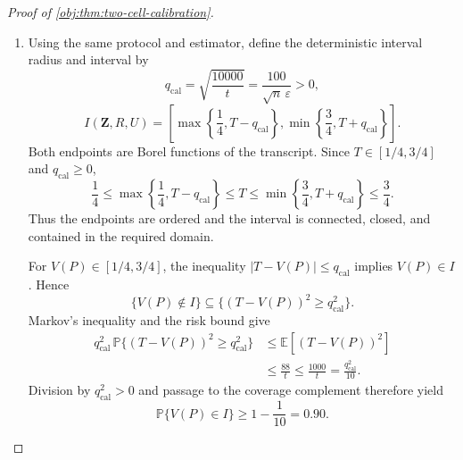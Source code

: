 \begin{proof}[Proof of \cref{obj:thm:two-cell-calibration}]
\begin{enumerate}
Projection toward this interval reduces squared error:
\[
(T-V(P))^2
\le(\widetilde V_{\mathrm{cal}}-V(P))^2.
\]
Indeed, if \(\widetilde V_{\mathrm{cal}}\le1/4\), then
\(T=1/4\le V(P)\); if \(\widetilde V_{\mathrm{cal}}\ge3/4\), then
\(V(P)\le T=3/4\); and inside the interval \(T=\widetilde V_{\mathrm{cal}}\).

The reverse triangle inequality gives
\[
\bigl(|\widehat\tau_j|-|\tau_j(P)|\bigr)^2
\le(\widehat\tau_j-\tau_j(P))^2
\qquad(j\in[2]).
\]
Applying the squared-sum inequality first to the baseline and contrast contributions and then to the two contrast contributions proves the pointwise bound
\[
(T-V(P))^2
\le
2(\widehat B_{\mathrm{cal}}-B(P))^2
+\frac{
(\widehat\tau_1-\tau_1(P))^2+
(\widehat\tau_2-\tau_2(P))^2
}{4}.
\]
Integrating and substituting the component bounds gives
\[
\mathbb E[(T-V(P))^2]
\le
\frac1{2m_{\mathrm{bin}}\delta^2}
+\frac2{m_{\mathrm{vec}}\delta^2}.
\]

The half split satisfies
\[
m_{\mathrm{bin}}\ge\frac n3,
\qquad
m_{\mathrm{vec}}\ge\frac n2.
\]
For the first inequality, even \(n\) gives \(m_{\mathrm{bin}}=n/2\); odd \(n\ge3\) gives
\(m_{\mathrm{bin}}=(n-1)/2\ge n/3\).
The second follows from \(m_{\mathrm{bin}}\le n/2\).
Together with \(\delta\ge\varepsilon/4\), these bounds yield the numerical calibration
\[
\begin{aligned}
\mathbb E[(T-V(P))^2]
&\le
\frac1{2(n/3)\delta^2}
+\frac2{(n/2)\delta^2}\\
&=\frac{88}{n(4\delta)^2}
\le\frac{88}{n\varepsilon^2}
=\frac{88}{t}
\le\frac{1000}{t}.
\end{aligned}
\]

\item
Using the same protocol and estimator, define the deterministic interval radius and interval by
\[
q_{\mathrm{cal}}
=\sqrt{\frac{10000}{t}}
=\frac{100}{\sqrt n\,\varepsilon}>0,
\]
\[
I(\mathbf Z,R,U)
=
\left[
\max\left\{\frac14,T-q_{\mathrm{cal}}\right\},
\min\left\{\frac34,T+q_{\mathrm{cal}}\right\}
\right].
\]
Both endpoints are Borel functions of the transcript. Since
\(T\in[1/4,3/4]\) and \(q_{\mathrm{cal}}\ge0\),
\[
\frac14
\le\max\left\{\frac14,T-q_{\mathrm{cal}}\right\}
\le T
\le\min\left\{\frac34,T+q_{\mathrm{cal}}\right\}
\le\frac34.
\]
Thus the endpoints are ordered and the interval is connected, closed, and contained in the required domain.

For \(V(P)\in[1/4,3/4]\), the inequality
\(|T-V(P)|\le q_{\mathrm{cal}}\) implies \(V(P)\in I\). Hence
\[
\{V(P)\notin I\}
\subseteq
\{(T-V(P))^2\ge q_{\mathrm{cal}}^2\}.
\]
Markov's inequality and the risk bound give
\[
\begin{aligned}
q_{\mathrm{cal}}^2\,
\mathbb P\{(T-V(P))^2\ge q_{\mathrm{cal}}^2\}
&\le\mathbb E[(T-V(P))^2]\\
&\le\frac{88}{t}
\le\frac{1000}{t}
=\frac{q_{\mathrm{cal}}^2}{10}.
\end{aligned}
\]
Division by \(q_{\mathrm{cal}}^2>0\) and passage to the coverage complement therefore yield
\[
\mathbb P\{V(P)\in I\}\ge1-\frac1{10}=0.90.
\]


\end{enumerate}
\end{proof}
